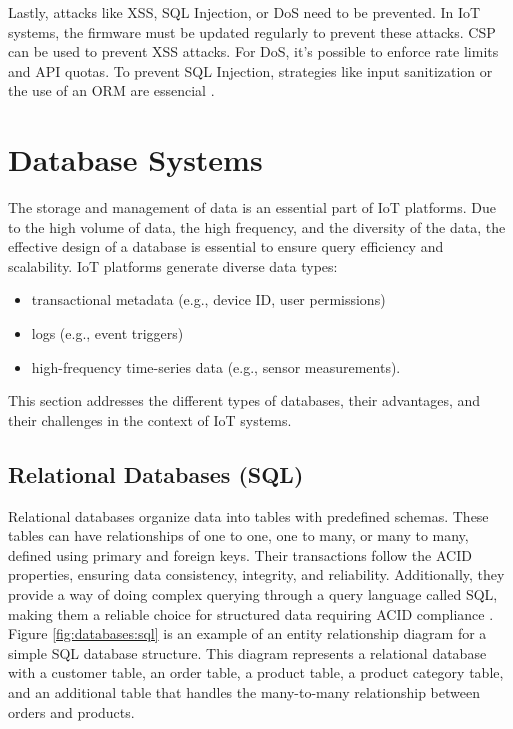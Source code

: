 Lastly, attacks like \gls{XSS}, \gls{SQL} Injection, or \gls{DoS} need to be prevented.
In \gls{IoT} systems, the firmware must be updated regularly to prevent these
attacks.
\gls{CSP} can be used to prevent \gls{XSS} attacks. For \gls{DoS}, it's possible to enforce
rate limits and \gls{API} quotas. To prevent \gls{SQL} Injection, strategies like
input sanitization or the use of an \gls{ORM} are essencial \cite{schiller2022landscape}.

\section{Database Systems}
The storage and management of data is an essential part of \gls{IoT} platforms.
Due to the high volume of data, the high frequency, and the diversity of the
data, the effective design of a database is essential to ensure query efficiency
and scalability.
\gls{IoT} platforms generate diverse data types:
\begin{itemize}
	\item transactional metadata (e.g., device \gls{ID}, user permissions)
	\item logs (e.g., event triggers)
	\item high-frequency time-series data (e.g., sensor measurements).
\end{itemize}

This section addresses the different types of databases, their advantages, and
their challenges in the context of \gls{IoT} systems.

\subsection{Relational Databases (SQL)}
Relational databases organize data into tables with predefined schemas.
These tables can have relationships of one to one, one to many, or many to many,
defined using primary and foreign keys. Their transactions follow the \gls{ACID}
properties, ensuring data
consistency, integrity, and reliability. Additionally, they provide a way of
doing complex querying through a query language called \gls{SQL}, making them
a reliable choice for structured data requiring \gls{ACID} compliance \cite{bdcc7020097, Yadav2024}.
Figure \ref{fig:databases:sql}
is an example of an entity relationship diagram for a simple \gls{SQL} database structure.
This diagram represents a relational database with a customer table, an order table, a product table, a product
category table, and an additional table that handles the many-to-many
relationship between orders and products.

